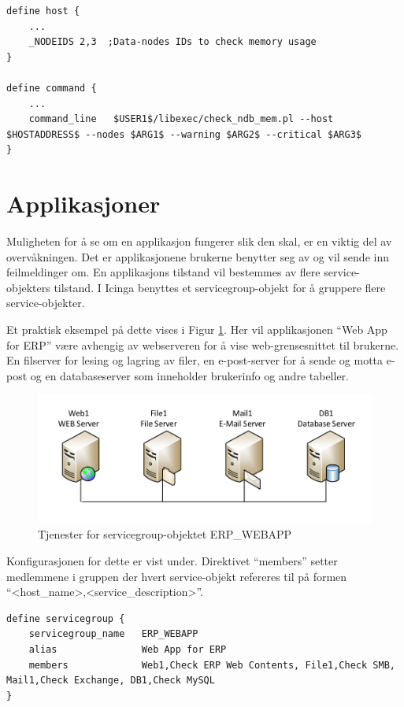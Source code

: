 \begin{lstlisting}[style=example]
define host {
	...
	_NODEIDS 2,3  ;Data-nodes IDs to check memory usage
}

define command {
	...
	command_line   $USER1$/libexec/check_ndb_mem.pl --host $HOSTADDRESS$ --nodes $ARG1$ --warning $ARG2$ --critical $ARG3$
}
\end{lstlisting}
\section{Applikasjoner}
Muligheten for å se om en applikasjon fungerer slik den skal, er en viktig del av overvåkningen. Det er applikasjonene brukerne benytter seg av og vil sende inn feilmeldinger om. En applikasjons tilstand vil bestemmes av flere service-objekters tilstand. I Icinga benyttes et servicegroup-objekt for å gruppere flere service-objekter.

Et praktisk eksempel på dette vises i Figur \ref{servicegroup_layout}. Her vil applikasjonen ``Web App for ERP'' være avhengig av webserveren for å vise web-grensesnittet til brukerne. En filserver for lesing og lagring av filer, en e-post-server for å sende og motta e-post og en databaseserver som inneholder brukerinfo og andre tabeller. 

\begin{figure}[H]
    \centering
    \includegraphics[scale=0.6]{img/servicegroup_layout}
    \caption{Tjenester for servicegroup-objektet ERP\_WEBAPP}
    \label{servicegroup_layout}
\end{figure}

Konfigurasjonen for dette er vist under. Direktivet ``members'' setter medlemmene i gruppen der hvert service-objekt refereres til på formen ``<host\_name>,<service\_description>''.

\begin{lstlisting}[style=example]
define servicegroup {
	servicegroup_name	ERP_WEBAPP
	alias 				Web App for ERP
	members 			Web1,Check ERP Web Contents, File1,Check SMB, Mail1,Check Exchange, DB1,Check MySQL
}
\end{lstlisting}

